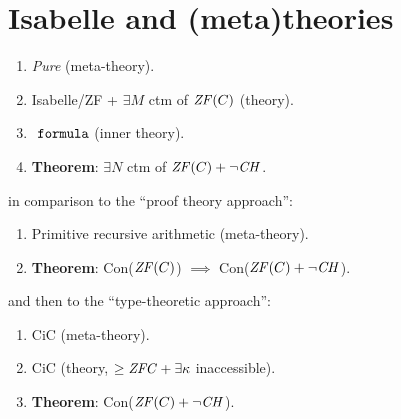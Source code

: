 \section{Isabelle and (meta)theories}

\begin{enumerate}
\item \emph{Pure} (meta-theory).
\item Isabelle/ZF + $\exists M$ ctm of $\mathit{ZF}(C)$ (theory). 
\item $\formula$ (inner theory).
\item \textbf{Theorem}: $\exists N$ ctm of $\mathit{ZF}(C)+\neg\mathit{CH}$.
\end{enumerate}

in comparison to the ``proof theory approach'':

\begin{enumerate}
\item Primitive recursive arithmetic (meta-theory).
\item \textbf{Theorem}: Con($\mathit{ZF}(C)$) $\implies$ Con($\mathit{ZF}(C)+\neg\mathit{CH}$).
\end{enumerate}

and then to the ``type-theoretic approach'':

\begin{enumerate}
\item CiC (meta-theory).
\item CiC (theory, $\geq \mathit{ZFC} + \exists \kappa$ inaccessible).
\item \textbf{Theorem}: Con($\mathit{ZF}(C)+\neg\mathit{CH}$).
\end{enumerate}

